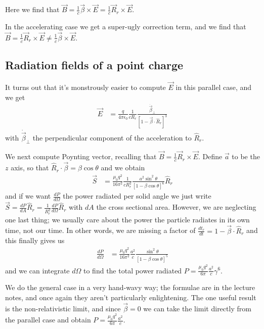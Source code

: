 \documentclass[10pt,twocolumn]{article}
\newcommand{\rd}[2]{\frac{d#1}{d#2}}
\begin{document}
Here we find that $\vec{B} = \frac{1}{c}\vec{\beta} \times \vec{E} = \frac{1}{c}\vec{R}_r \times \vec{E}$.

In the accelerating case we get a super-ugly correction term, and we find that $\vec{B} = \frac{1}{c}\vec{R}_r \times \vec{E} \neq \frac{1}{c}\vec{\beta} \times \vec{E}$. 

\subsection{Radiation fields of a point charge}

It turns out that it's monstrously easier to compute $\vec{E}$ in this parallel case, and we get
\begin{align}
    \vec{E} &= \frac{q}{4\pi\epsilon_0}\frac{1}{cR_r}\frac{\dot{\vec{\beta}}_{\perp}}{\left[ 1 - \vec{\beta} \cdot \hat{R}_r \right]^3}
\end{align}
with $\dot{\vec{\beta}}_{\perp}$ the perpendicular component of the acceleration to $\hat{R}_r$.

We next compute Poynting vector, recalling that $\vec{B} = \frac{1}{c}\vec{R}_r \times \vec{E}$. Define $\vec{a}$ to be the $z$ axis, so that $\hat{R}_r \cdot \vec{\beta} = \beta \cos \theta$ and we obtain
\begin{align}
    \vec{S} &= \frac{\mu_0 q^2}{16 \pi^2}\frac{1}{cR_r^2}\frac{a^2\sin^2\theta}{\left[ 1 - \beta \cos\theta \right]^6}\hat{R}_r
\end{align}
and if we want $\rd{P}{\Omega}$ the power radiated per solid angle we just write $\vec{S} = \rd{P}{A}\hat{R}_r = \frac{1}{R_r^2}\rd{P}{\Omega}\hat{R}_r$ with $dA$ the cross sectional area. However, we are neglecting one last thing; we usually care about the power the particle radiates in its own time, not our time. In other words, we are missing a factor of $\rd{t_r}{t} = 1 - \vec{\beta} \cdot \hat{R}_r$ and this finally gives us
\begin{align}
    \rd{P}{\Omega} &= \frac{\mu_0 q^2}{16 \pi^2}\frac{a^2}{c}\frac{\sin^2\theta}{\left[ 1 - \beta \cos\theta \right]^5}
\end{align}
and we can integrate $d\Omega$ to find the total power radiated $P = \frac{\mu_0 q^2}{6\pi}\frac{a^2}{c}\gamma^6$.

We do the general case in a very hand-wavy way; the formulae are in the lecture notes, and once again they aren't particularly enlightening. The one useful result is the non-relativistic limit, and since $\vec{\beta} = 0$ we can take the limit directly from the parallel case and obtain $P = \frac{\mu_0 q^2}{6\pi}\frac{a^2}{c}$. 
\end{document}
